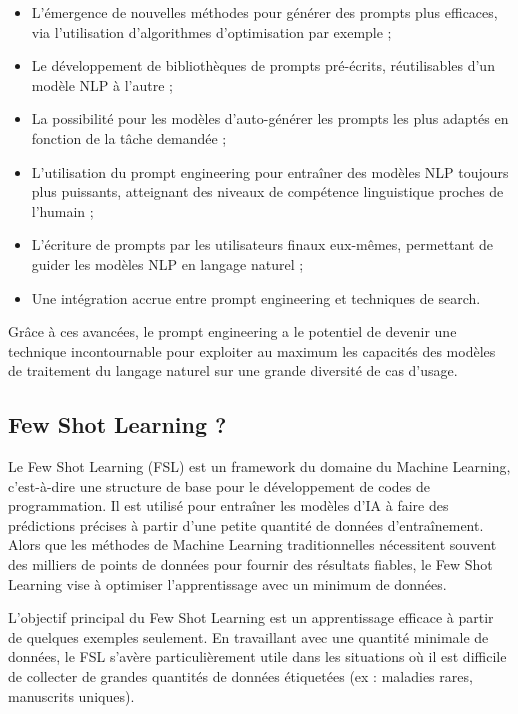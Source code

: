 \begin{itemize}
	\item L’émergence de nouvelles méthodes pour générer des prompts plus efficaces,
		via l’utilisation d’algorithmes d’optimisation par exemple ;

	\item Le développement de bibliothèques de prompts pré-écrits, réutilisables
		d’un modèle NLP à l’autre ;

	\item La possibilité pour les modèles d’auto-générer les prompts les plus adaptés
		en fonction de la tâche demandée ;

	\item L’utilisation du prompt engineering pour entraîner des modèles NLP toujours
		plus puissants, atteignant des niveaux de compétence linguistique proches de
		l’humain ;

	\item L’écriture de prompts par les utilisateurs finaux eux-mêmes, permettant
		de guider les modèles NLP en langage naturel ;

	\item Une intégration accrue entre prompt engineering et techniques de search.
\end{itemize}

Grâce à ces avancées, le prompt engineering a le potentiel de devenir une technique
incontournable pour exploiter au maximum les capacités des modèles de traitement
du langage naturel sur une grande diversité de cas d’usage.

\subsection{Few Shot Learning ?}
Le Few Shot Learning (FSL) est un framework du domaine du Machine Learning,
c’est-à-dire une structure de base pour le développement de codes de
programmation. Il est utilisé pour entraîner les modèles d’IA à faire des prédictions
précises à partir d’une petite quantité de données d’entraînement. Alors que les
méthodes de Machine Learning traditionnelles nécessitent souvent des milliers de
points de données pour fournir des résultats fiables, le Few Shot Learning vise à
optimiser l’apprentissage avec un minimum de données.

L’objectif principal du Few Shot Learning est un apprentissage efficace à partir
de quelques exemples seulement. En travaillant avec une quantité minimale de
données, le FSL s’avère particulièrement utile dans les situations où il est difficile
de collecter de grandes quantités de données étiquetées (ex : maladies rares, manuscrits
uniques).

